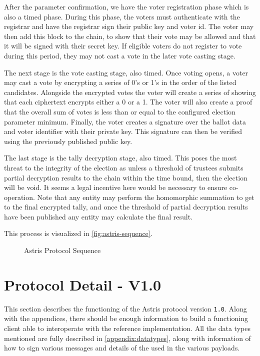 After the parameter confirmation, we have the voter registration phase which is also a timed phase. During this phase, the voters must authenticate with the registrar and have the registrar sign their public key and voter id. The voter may then add this block to the chain, to show that their vote may be allowed and that it will be signed with their secret key. If eligible voters do not register to vote during this period, they may not cast a vote in the later vote casting stage.

The next stage is the vote casting stage, also timed. Once voting opens, a voter may cast a vote by encrypting a series of 0's or 1's in the order of the listed candidates. Alongside the encrypted votes the voter will create a series of  showing that each ciphertext encrypts either a 0 or a 1. The voter will also create a proof that the overall sum of votes is less than or equal to the configured election parameter minimum. Finally, the voter creates a signature over the ballot data and voter identifier with their private key. This signature can then be verified using the previously published public key.

The last stage is the tally decryption stage, also timed. This poses the most threat to the integrity of the election as unless a threshold of trustees submits partial decryption results to the chain within the time bound, then the election will be void. It seems a legal incentive here would be necessary to ensure co-operation. Note that any entity may perform the homomorphic summation to get to the final encrypted tally, and once the threshold of partial decryption results have been published any entity may calculate the final result.

This process is visualized in \autoref{fig:astris-sequence}.

\begin{figure}[H]
    \centering
    
    \caption{Astris Protocol Sequence}
    \label{fig:astris-sequence}
\end{figure}

\section{Protocol Detail - V1.0}
\label{ch:astris:detail}

This section describes the functioning of the Astris protocol version \texttt{1.0}. Along with the appendices, there should be enough information to build a functioning client able to interoperate with the reference implementation. All the data types mentioned are fully described in \autoref{appendix:datatypes}, along with information of how to sign various messages and details of the  used in the various payloads.

